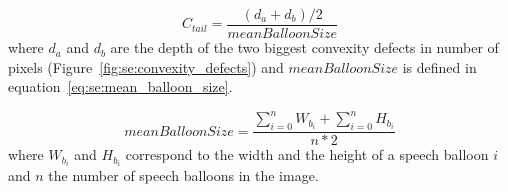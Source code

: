 \begin{equation}
\label{eq:se:confidence_tail}
  C_{tail} = \frac{(d_a+d_b)/2}{meanBalloonSize}
\end{equation}
where $d_a$ and $d_b$ are the depth of the two biggest convexity defects in number of pixels (Figure~\ref{fig:se:convexity_defects}) and $meanBalloonSize$ is defined in equation~\ref{eq:se:mean_balloon_size}.

\begin{equation}
  \label{eq:se:mean_balloon_size}
  meanBalloonSize = \frac{\sum\limits_{i=0}^n W_{b_i} + \sum\limits_{i=0}^n H_{b_i}}{n * 2}  
\end{equation}
where $W_{b_i}$ and $H_{b_i}$ correspond to the width and the height of a speech  balloon $i$ and $n$ the number of speech balloons in the image.








